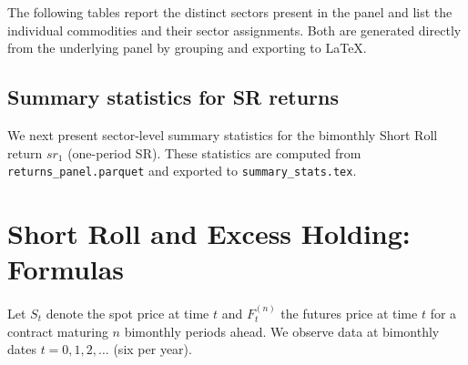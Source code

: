 \documentclass[11pt]{article}
\begin{document}
The following tables report the distinct sectors present in the panel and
list the individual commodities and their sector assignments.
Both are generated directly from the underlying panel by grouping and
exporting to \LaTeX.

\begin{table}[h]
  \centering
  \caption{List of sectors in the commodity panel.
  This table summarizes the sector classification used throughout the
  replication (Energy, Meats, Metals, Grains, Oilseeds, Softs, Industrial
  Materials, and an equally-weighted ``All'' portfolio).}
  \label{tab:sectors}
  
\end{table}

\begin{table}[h]
  \centering
  \caption{List of commodities and their sectors.
  The table maps each individual commodity in the panel to a sector, which is
  the basis for the sector-level equal-weighted portfolios used in all
  subsequent analysis.}
  \label{tab:commodities}
  
\end{table}

\subsection*{Summary statistics for SR returns}

We next present sector-level summary statistics for the bimonthly Short Roll
return \(sr_1\) (one-period SR).
These statistics are computed from \texttt{returns\_panel.parquet} and
exported to \texttt{summary\_stats.tex}.

\begin{table}[h]
  \centering
  \caption{Summary statistics for bimonthly \(sr_1\) returns by sector.
  For each sector, we report the mean, standard deviation, range, skewness,
  and kurtosis of the \(sr_1\) series.}
  \label{tab:summary}
  
\end{table}

\section{Short Roll and Excess Holding: Formulas}

Let \(S_t\) denote the spot price at time \(t\) and \(F_t^{(n)}\) the
futures price at time \(t\) for a contract maturing \(n\) bimonthly periods
ahead.
We observe data at bimonthly dates \(t = 0,1,2,\dots\) (six per year).
\end{document}
